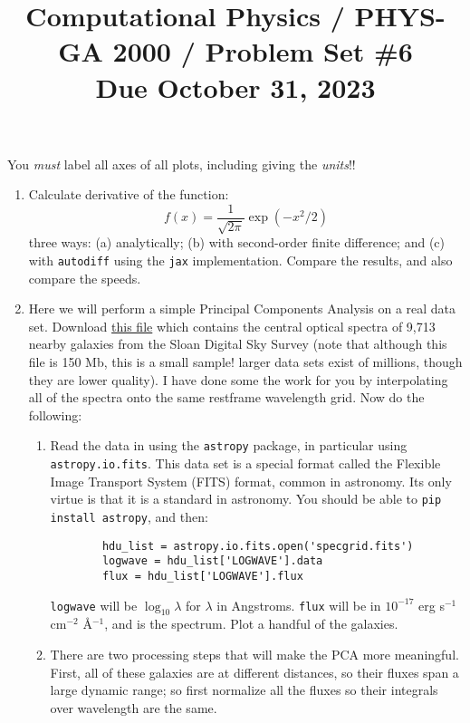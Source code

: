 \documentclass[11pt, preprint]{aastex}
\begin{document}
\title{\bf Computational Physics / PHYS-GA 2000 / Problem Set \#6
\\ Due October 31, 2023 }

You {\it must} label all axes of all plots, including giving the {\it
  units}!!

\begin{enumerate}
\item Calculate derivative of the function:
  \begin{equation}
    f(x) = \frac{1}{\sqrt{2\pi}} \exp\left(-x^2/2\right)
  \end{equation}
  three ways: (a) analytically; (b) with second-order finite
  difference; and (c) with {\tt autodiff} using the {\tt jax}
  implementation. Compare the results, and also compare the speeds.
\item Here we will perform a simple Principal Components Analysis on a
  real data set. Download \href{}{this file} which contains the
  central optical spectra of 9,713 nearby galaxies from the Sloan
  Digital Sky Survey (note that although this file is 150 Mb, this is
  a small sample!  larger data sets exist of millions, though they are
  lower quality). I have done some the work for you by interpolating
  all of the spectra onto the same restframe wavelength grid. Now do
  the following:
  \begin{enumerate}
    \item Read the data in using the {\tt astropy} package, in
      particular using {\tt astropy.io.fits}. This data set is a
      special format called the Flexible Image Transport System (FITS)
      format, common in astronomy. Its only virtue is that it is a
      standard in astronomy. You should be able to {\tt pip install
        astropy}, and then:
      \begin{verbatim}
        hdu_list = astropy.io.fits.open('specgrid.fits')
        logwave = hdu_list['LOGWAVE'].data
        flux = hdu_list['LOGWAVE'].flux
      \end{verbatim}
      {\tt logwave} will be $\log_{10}\lambda$ for $\lambda$ in
      Angstroms. {\tt flux} will be in $10^{-17}$ erg s$^{-1}$
      cm$^{-2}$ \AA$^{-1}$, and is the spectrum. Plot a handful
      of the galaxies.
    \item There are two processing steps that will make the PCA more
      meaningful. First, all of these galaxies are at different
      distances, so their fluxes span a large dynamic range; so first
      normalize all the fluxes so their integrals over wavelength are
      the same.

\end{enumerate}
\end{enumerate}
\end{document}
